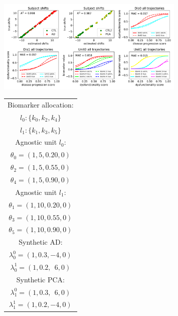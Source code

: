 \documentclass{llncs}
\begin{document}
\begin{figure}[htp]
\includegraphics[width=0.8\textwidth]{figures/compTrueParams105_synth1_JMD.pdf}
\begin{flushright}
\vspace{-16.0em}
\fontsize{5}{8.0}\selectfont
 \begin{tabular}{c}
 Biomarker allocation:\\
 $l_0:\{k_0, k_2, k_4\}$ \\
 $l_1: \{k_1, k_3, k_5\}$ \\
\hline
Agnostic unit $l_0$:\\
$\theta_0 = (1,5,0.20,0)$\\
$\theta_2 = (1,5,0.55,0)$\\
$\theta_4 = (1,5,0.90,0)$ \\
\hline
Agnostic unit $l_1$:\\
$\theta_1 = (1,10,0.20,0)$\\
$\theta_3 = (1,10,0.55,0)$\\
$\theta_5 = (1,10,0.90,0)$ \\
\hline  
Synthetic AD:\\
$\lambda_0^0 = (1, 0.3, -4, 0)$\\
$\lambda_0^1 = (1, 0.2,\ \ 6, 0)$ \\
\hline
Synthetic PCA:\\ 
$\lambda_1^0 = (1, 0.3,\ \ 6, 0)$\\
$\lambda_1^1 = (1, 0.2, -4, 0)$\\

\end{tabular}
\end{flushright}
\end{figure}
\end{document}
